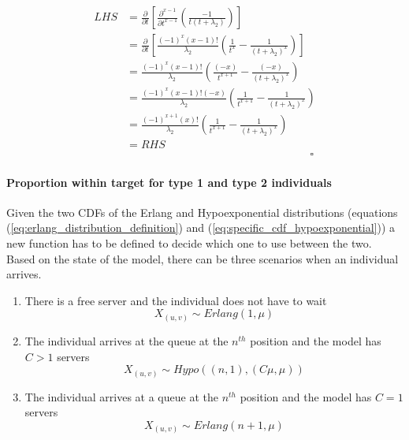 \begin{itemize}
\begin{enumerate}
        \begin{equation*}
            \begin{split}
                LHS &= \frac{\partial}{\partial t}
                \left[ \frac{\partial^{x-1}}{\partial t ^ {x-1}}
                \left( \frac{-1}{t (t + \lambda_2)} \right) \right] \\
                &= \frac{\partial}{\partial t} \left[
                    \frac{(-1)^x (x-1)!}{\lambda_2} \left(
                        \frac{1}{t^x} - \frac{1}{(t + \lambda_2)^x}
                    \right)
                \right] \\
                &= \frac{(-1)^x (x-1)!}{\lambda_2} \left(
                    \frac{(-x)}{t^{x+1}} - \frac{(-x)}{(t + \lambda_2)^x}
                \right) \\
                &= \frac{(-1)^x (x-1)! (-x)}{\lambda_2} \left(
                    \frac{1}{t^{x+1}} - \frac{1}{(t + \lambda_2)^x}
                \right) \\
                &= \frac{(-1)^{x+1} (x)!}{\lambda_2} \left(
                    \frac{1}{t^{x+1}} - \frac{1}{(t + \lambda_2)^x}
                \right) \\
                & = RHS \\
                & \hspace{7cm} \square
            \end{split}
        \end{equation*}
    \end{enumerate}
\end{itemize}

\paragraph{Proportion within target for type 1 and type 2 individuals}

Given the two CDFs of the Erlang and Hypoexponential distributions (equations
(\ref{eq:erlang_distribution_definition}) and
(\ref{eq:specific_cdf_hypoexponential})) a new function has to be defined to
decide which one to use between the two.
Based on the state of the model, there can be three scenarios when an individual
arrives.
\begin{enumerate}
    \item There is a free server and the individual does not have to wait
    \begin{equation*}
        X_{(u,v)} \sim Erlang(1, \mu)
    \end{equation*}
    \item The individual arrives at the queue at the \(n^{th}\) position and the
    model has \(C > 1\) servers
    \begin{equation*}
        X_{(u,v)} \sim Hypo((n, 1), (C \mu, \mu))
    \end{equation*}
    \item The individual arrives at a queue at the \(n^{th}\) position and the
    model has \(C = 1\) servers
    \begin{equation*}
        X_{(u,v)} \sim Erlang(n + 1, \mu)
    \end{equation*}
\end{enumerate}

